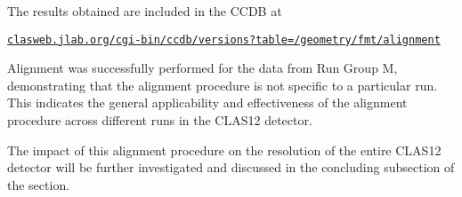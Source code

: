     The results obtained are included in the CCDB at

    \small\href{https://clasweb.jlab.org/cgi-bin/ccdb/versions?table=/geometry/fmt/alignment}{\texttt{clasweb.jlab.org/cgi-bin/ccdb/versions?table=/geometry/fmt/alignment}}

    Alignment was successfully performed for the data from Run Group M, demonstrating that the alignment procedure is not specific to a particular run.
    This indicates the general applicability and effectiveness of the alignment procedure across different runs in the CLAS12 detector.

    The impact of this alignment procedure on the resolution of the entire CLAS12 detector will be further investigated and discussed in the concluding subsection of the section.
